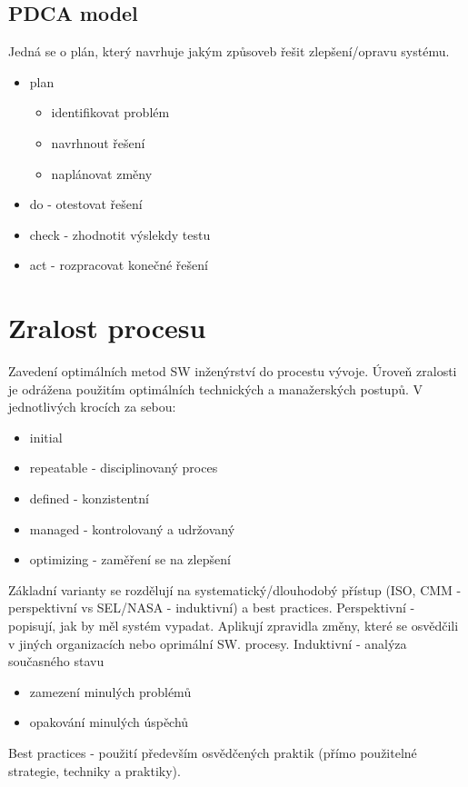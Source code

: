\documentclass{szzclass}
\begin{document}
\subsection{PDCA model}
Jedná se o plán, který navrhuje jakým způsoveb řešit zlepšení/opravu systému.
\begin{itemize}
    \item plan
    \begin{itemize}
        \item identifikovat problém
        \item navrhnout řešení
        \item naplánovat změny
    \end{itemize}
    \item do - otestovat řešení
    \item check - zhodnotit výslekdy testu
    \item act - rozpracovat konečné řešení
\end{itemize}
\section{Zralost procesu}
Zavedení optimálních metod SW inženýrství do procestu vývoje. Úroveň zralosti je odrážena použitím optimálních technických a manažerských postupů.
V jednotlivých krocích za sebou:
\begin{itemize}
    \item initial
    \item repeatable - disciplinovaný proces
    \item defined - konzistentní
    \item managed - kontrolovaný a udržovaný
    \item optimizing - zaměření se na zlepšení
\end{itemize}
Základní varianty se rozdělují na systematický/dlouhodobý přístup (ISO, CMM - perspektivní vs SEL/NASA - induktivní) a best practices.
\newline
Perspektivní - popisují, jak by měl systém vypadat. Aplikují zpravidla změny, které se osvědčili v jiných organizacích nebo oprimální SW. procesy.
\newline
Induktivní - analýza současného stavu
\begin{itemize}
    \item zamezení minulých problémů
    \item opakování minulých úspěchů
\end{itemize}
Best practices - použití především osvědčených praktik (přímo použitelné strategie, techniky a praktiky).
\end{document}

